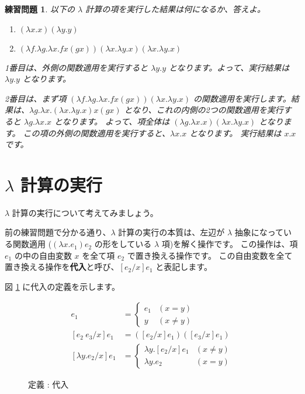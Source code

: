 \documentclass[b5paper]{jsbook}
\newtheorem{exercise}{練習問題}[chapter]
\begin{document}
\begin{exercise}

以下の $\lambda$ 計算の項を実行した結果は何になるか、答えよ。

\begin{enumerate}
  \item $(\lambda x . x) (\lambda y . y)$
  \item $(\lambda f . \lambda g . \lambda x . f x (g x))
		(\lambda x . \lambda y . x) (\lambda x . \lambda y . x)$
\end{enumerate}

1番目は、外側の関数適用を実行すると $\lambda y . y$ となります。よって、実行結果は $\lambda y . y$
となります。

2番目は、まず項 $(\lambda f . \lambda g . \lambda x . f x (g x)) (\lambda x . \lambda y . x)$
の関数適用を実行します。結果は、$\lambda g . \lambda x . (\lambda x . \lambda y . x) x (g x)$
となり、これの内側の2つの関数適用を実行すると $\lambda g . \lambda x . x$ となります。
よって、項全体は $(\lambda g . \lambda x . x) (\lambda x . \lambda y . x)$ となります。
この項の外側の関数適用を実行すると、$\lambda x . x$ となります。
実行結果は $x . x$ です。

\end{exercise}

\section{$\lambda$ 計算の実行}

$\lambda$ 計算の実行について考えてみましょう。

前の練習問題で分かる通り、$\lambda$ 計算の実行の本質は、左辺が $\lambda$ 抽象になっている関数適用
($(\lambda x . e_1) e_2$ の形をしている $\lambda$ 項)を解く操作です。
この操作は、項 $e_1$ の中の自由変数 $x$ を全て項 $e_2$ で置き換える操作です。
この自由変数を全て置き換える操作を\textbf{代入}と呼び、$[e_2/x] e_1$ と表記します。

図 \ref{fig:lambda-substitute} に代入の定義を示します。

\begin{figure}[htbp]
  \begin{align*}
    [y/x] e_1 & = \left \{
      \begin{array}{ll}
        e_1 & (x = y) \\
        y & (x \neq y)
      \end{array}
      \right. \\
    [e_2 ~ e_3/x] e_1 & = ([e_2/x] e_1) ([e_3/x] e_1) \\
    [\lambda y . e_2/x] e_1 & = \left \{
      \begin{array}{ll}
        \lambda y . [e_2/x] e_1 & (x \neq y) \\
        \lambda y . e_2 & (x = y)
      \end{array}
      \right.
  \end{align*}
  \caption{定義 : 代入}
  \label{fig:lambda-substitute}
\end{figure}
\end{document}

